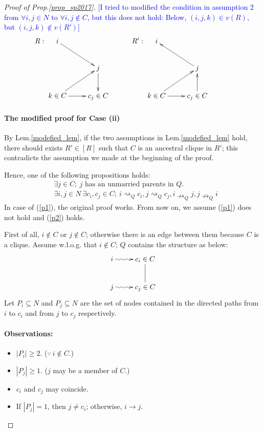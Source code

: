 \documentclass[11pt,a4paper,dvipdfmx]{article}
\theoremstyle{plain}
\newcommand{\kcomment}[1]{{\textcolor{blue}{#1}}}
\begin{document}
\begin{proof}[Proof of Prop.\ref{prop_sp2017}]
	\kcomment{[I tried to modified the condition in assumption 2 from $\forall i, j \in N$ to $\forall i,j \notin C$, but this does not hold: Below, $(i,j,k) \in v(R)$, but $(i,j,k) \notin v(R')$]
	\[
	R:
	\xymatrix{
		  i \ar[rd] & \\
		  & j \ar[d] & \\
		  k \in C \ar[r] \ar[ru] & c_j \in C
	}
	R':
	\xymatrix{
		  i  & \\
		  & j \ar[lu] & \\
		  k \in C \ar[r] \ar[ru] & c_j \in C \ar[u]
	}
	\]
	}
	
	
	\paragraph{The modified proof for Case (ii)}
	By Lem.\ref{modefied_lem}, if the two assumptions in Lem.\ref{modefied_lem} hold, there should exists $R' \in [R]$ such that $C$ is an ancestral clique in $R'$; this contradicts the assumption we made at the beginning of the proof.
	
	Hence, one of the following propositions holds:
	\begin{align}
		&\exists j \in C; \ j \text{ has an unmarried parents in } Q. \tag{P1} \label{p1}\\
		&\exists i, j \in N \ \exists c_i, c_j \in C; \ i \rightsquigarrow_Q c_i, j \rightsquigarrow_Q c_j, i \nrightarrow_Q j, j \nrightarrow_Q i \tag{P2} \label{p2}
	\end{align}
	In case of (\ref{p1}), the original proof works. From now on, we assume (\ref{p1}) does not hold and (\ref{p2}) holds.
	
	First of all, $i \notin C$ or $j \notin C$; otherwise there is an edge between them because $C$ is a clique. Assume w.l.o.g. that $i \notin C$; $Q$ contains the structure as below:
	\[
	\xymatrix{
		  i \ar@{~>}[r] & c_i \in C\\
		  j \ar@{~>}[r] & c_j \in C \ar@{-}[u]
	}
	\]
	Let $P_i \subseteq N$ and $P_j \subseteq N$ are the set of nodes contained in the directed paths from $i$ to $c_i$ and from $j$ to $c_j$ respectively.
	
	\begin{screen}
		\paragraph{Observations:}
	\begin{itemize}
		\item $|P_i| \geq 2$. ($\because \ i \notin C$.)
		\item $|P_j| \geq 1$. ($j$ may be a member of $C$.)
		\item $c_i$ and $c_j$ may coincide.
		\item If $|P_j|=1$, then $j \neq c_i$; otherwise, $i \to j$.
	\end{itemize}
	\end{screen}
	

\end{proof}
\end{document}
